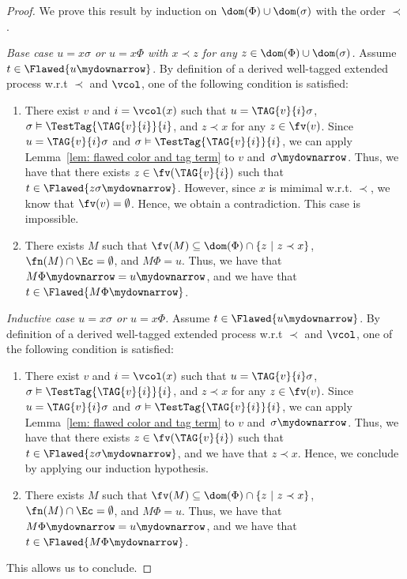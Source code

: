 \begin{proof}
We prove this result by induction on $\dom(\Phi) \cup \dom(\sigma)$
with the order $\prec$.

\smallskip{}

\noindent \emph{Base case $u = x\sigma$ or $u = x\Phi$ with $x \prec
  z$ for any $z \in \dom(\Phi) \cup \dom(\sigma)$.} Assume $t \in \Flawed{u\mydownarrow}$.
By definition of a derived well-tagged extended process w.r.t $\prec$ and $\vcol$, one of the
following condition is satisfied:
\begin{enumerate}
\item There exist $v$ and $i = \vcol(x)$ such that $u
=\TAG{v}{i}\sigma$, $\sigma \vDash \TestTag{\TAG{v}{i}}{i}$, and $z
\prec x$ for any $z \in \fv(v)$.  Since $u = \TAG{v}{i}\sigma$ and $\sigma \vDash
 \TestTag{\TAG{v}{i}}{i}$, we can apply Lemma~\ref{lem: flawed color and tag term}
 to $v$ and~$\sigma\mydownarrow$. Thus, we have that there exists $z \in
 \fv(\TAG{v}{i})$ such that $t \in
 \Flawed{z\sigma\mydownarrow}$. However, since $x$ is mimimal w.r.t. $\prec$,
we know that $\fv(v) = \emptyset$.   Hence, we obtain a
contradiction. This case is impossible.
\item There exists $M$ such that $\fv(M) \subseteq \dom(\Phi) \cap \{z
  ~|~ z \prec x\}$, $\fn(M) \cap \Ec = \emptyset$, and $M\Phi =
  u$. Thus, we have that $M\Phi\mydownarrow = u\mydownarrow$, and we
  have that $t \in \Flawed{M\Phi\mydownarrow}$.
\end{enumerate}

\medskip{}

\noindent \emph{Inductive case $u = x\sigma$ or $u = x\Phi$.} Assume $t \in \Flawed{u\mydownarrow}$.
By definition of a derived well-tagged extended process w.r.t $\prec$ and $\vcol$, one of the
following condition is satisfied:
\begin{enumerate}
\item There exist $v$ and $i = \vcol(x)$ such that $u
=\TAG{v}{i}\sigma$, $\sigma \vDash \TestTag{\TAG{v}{i}}{i}$, and $z
\prec x$ for any $z \in \fv(v)$.  Since $u = \TAG{v}{i}\sigma$ and $\sigma \vDash
 \TestTag{\TAG{v}{i}}{i}$, we can apply Lemma~\ref{lem: flawed color and tag term}
 to $v$ and~$\sigma\mydownarrow$. Thus, we have that there exists $z \in
 \fv(\TAG{v}{i})$ such that $t \in
 \Flawed{z\sigma\mydownarrow}$, and we have that $z \prec x$.
Hence, we conclude by applying our induction hypothesis.
\item There exists $M$ such that $\fv(M) \subseteq \dom(\Phi) \cap \{z
  ~|~ z \prec x\}$, $\fn(M) \cap \Ec = \emptyset$, and $M\Phi =
  u$. Thus, we have that $M\Phi\mydownarrow = u\mydownarrow$, and we
  have that $t \in \Flawed{M\Phi\mydownarrow}$.
\end{enumerate}
This allows us to conclude.
\end{proof}



